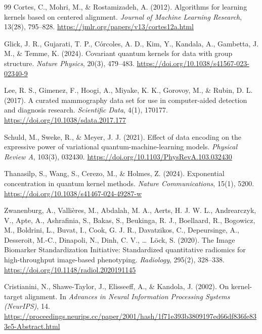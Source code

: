 \begin{thebibliography}{99}
    Cortes, C., Mohri, M., \& Rostamizadeh, A. (2012).
    Algorithms for learning kernels based on centered alignment.
    \textit{Journal of Machine Learning Research}, 13(28), 795--828.
    \url{https://jmlr.org/papers/v13/cortes12a.html}

    Glick, J. R., Gujarati, T. P., C{\'{o}}rcoles, A. D., Kim, Y., Kandala, A., Gambetta, J. M., \& Temme, K. (2024).
    Covariant quantum kernels for data with group structure.
    \textit{Nature Physics}, 20(3), 479--483.
    \url{https://doi.org/10.1038/s41567-023-02340-9}

    Lee, R. S., Gimenez, F., Hoogi, A., Miyake, K. K., Gorovoy, M., \& Rubin, D. L. (2017).
    A curated mammography data set for use in computer-aided detection and diagnosis research.
    \textit{Scientific Data}, 4(1), 170177.
    \url{https://doi.org/10.1038/sdata.2017.177}

    Schuld, M., Sweke, R., \& Meyer, J. J. (2021).
    Effect of data encoding on the expressive power of variational quantum-machine-learning models.
    \textit{Physical Review A}, 103(3), 032430.
    \url{https://doi.org/10.1103/PhysRevA.103.032430}

    Thanasilp, S., Wang, S., Cerezo, M., \& Holmes, Z. (2024).
    Exponential concentration in quantum kernel methods.
    \textit{Nature Communications}, 15(1), 5200.
    \url{https://doi.org/10.1038/s41467-024-49287-w}

    Zwanenburg, A., Valli\`eres, M., Abdalah, M. A., Aerts, H. J. W. L., Andrearczyk, V., Apte, A., Ashrafinia, S., Bakas, S., Beukinga, R. J., Boellaard, R., Bogowicz, M., Boldrini, L., Buvat, I., Cook, G. J. R., Davatzikos, C., Depeursinge, A., Desseroit, M.-C., Dinapoli, N., Dinh, C. V., \ldots\ L\"ock, S. (2020).
    The Image Biomarker Standardization Initiative: Standardized quantitative radiomics for high-throughput image-based phenotyping.
    \textit{Radiology}, 295(2), 328--338.
    \url{https://doi.org/10.1148/radiol.2020191145}

    Cristianini, N., Shawe-Taylor, J., Elisseeff, A., \& Kandola, J. (2002). On kernel-target alignment.
    In \textit{Advances in Neural Information Processing Systems (NeurIPS)}, 14.
    \url{https://proceedings.neurips.cc/paper/2001/hash/1f71e393b3809197ed66df836fe833e5-Abstract.html}


\end{thebibliography}
